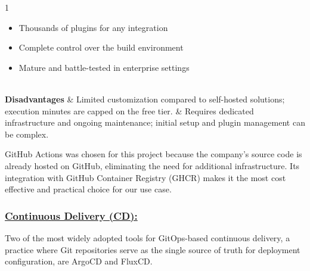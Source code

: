 \begin{table}[H]
\begin{tabularx}{1\textwidth}
\begin{itemize}[leftmargin=*, topsep=0pt, itemsep=1pt, parsep=2pt]
            \item Thousands of plugins for any integration
            \item Complete control over the build environment
            \item Mature and battle-tested in enterprise settings
        \end{itemize}                                                \\
        \hline
        \textbf {Disadvantages}             & \noindent Limited customization compared to self-hosted solutions; execution minutes are capped on the free tier.                                                                                                                                                                                                        & \noindent Requires dedicated infrastructure and ongoing maintenance; initial setup and plugin management can be complex. \\
        \hline
    \end{tabularx}
\end{table}
GitHub Actions was chosen for this project because the company's source code 
is already hosted on GitHub, eliminating the need for additional infrastructure. 
Its integration with GitHub Container Registry (GHCR) \cite{ghcr} makes it the most cost effective 
and practical choice for our use case.

\subsubsection*{\underline{Continuous Delivery (CD):}}
Two of the most widely adopted tools for GitOps-based continuous delivery, 
a practice where Git repositories serve as the single source of truth for 
deployment configuration, are ArgoCD and FluxCD.


